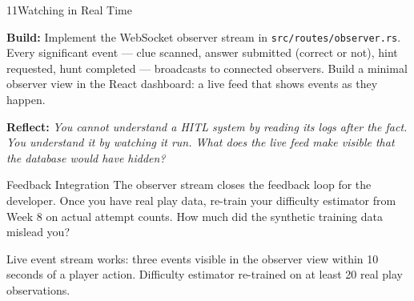 \documentclass[
  11pt,
  oneside,
  DIV=12,
]{scrartcl}
\newcommand{\build}[1]{\textbf{\color{SpringMoss}Build:} #1}
\newcommand{\reflect}[1]{\textbf{\color{ConceptBlue}Reflect:} \textit{#1}}
\begin{document}
\begin{milestone}{11}{Watching in Real Time}

\build{Implement the WebSocket observer stream in
\texttt{src/routes/observer.rs}. Every significant event — clue scanned,
answer submitted (correct or not), hint requested, hunt completed —
broadcasts to connected observers. Build a minimal observer view in the
React dashboard: a live feed that shows events as they happen.}

\medskip
\reflect{You cannot understand a HITL system by reading its logs after the
fact. You understand it by watching it run. What does the live feed make
visible that the database would have hidden?}

\begin{hitlconcept}{Feedback Integration}
  The observer stream closes the feedback loop for the developer. Once you
  have real play data, re-train your difficulty estimator from Week 8 on
  actual attempt counts. How much did the synthetic training data mislead you?
\end{hitlconcept}

\begin{checkpoint}
  Live event stream works: three events visible in the observer view within
  10 seconds of a player action. Difficulty estimator re-trained on at least
  20 real play observations.
\end{checkpoint}

\end{milestone}
\end{document}
